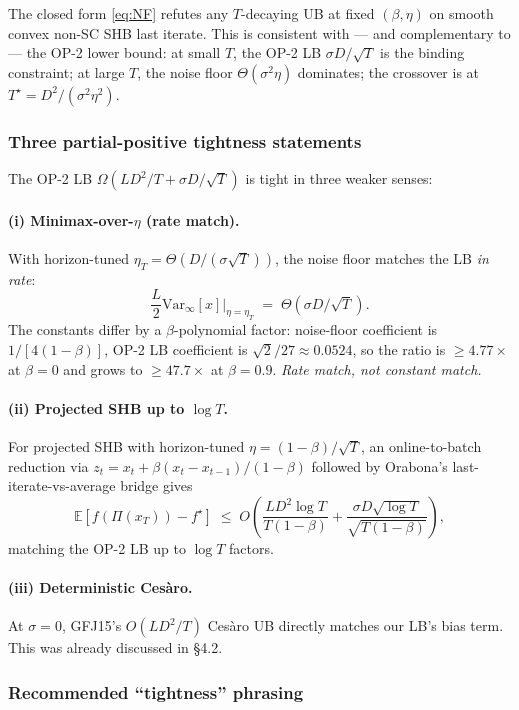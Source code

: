 \documentclass[11pt,a4paper]{article}
\theoremstyle{plain}
\theoremstyle{definition}
\theoremstyle{remark}
\newcommand{\E}{\mathbb{E}}
\begin{document}
The closed form \eqref{eq:NF} refutes any $T$-decaying UB at fixed $(\beta,\eta)$ on smooth convex non-SC SHB last iterate. This is consistent with --- and complementary to --- the OP-2 lower bound: at small $T$, the OP-2 LB $\sigma D/\sqrt T$ is the binding constraint; at large $T$, the noise floor $\Theta(\sigma^2\eta)$ dominates; the crossover is at $T^\star = D^2/(\sigma^2\eta^2)$.

\subsubsection*{Three partial-positive tightness statements}

The OP-2 LB $\Omega(LD^2/T + \sigma D/\sqrt T)$ is tight in three weaker senses:

\paragraph{(i) Minimax-over-$\eta$ (rate match).}
With horizon-tuned $\eta_T = \Theta(D/(\sigma\sqrt T))$, the noise floor matches the LB \emph{in rate}:
\[
  \frac{L}{2}\mathrm{Var}_\infty[x]\big|_{\eta=\eta_T} \;=\; \Theta(\sigma D / \sqrt T).
\]
The constants differ by a $\beta$-polynomial factor: noise-floor coefficient is $1/[4(1-\beta)]$, OP-2 LB coefficient is $\sqrt 2/27 \approx 0.0524$, so the ratio is $\geq 4.77\times$ at $\beta=0$ and grows to $\geq 47.7\times$ at $\beta=0.9$. \emph{Rate match, not constant match.}

\paragraph{(ii) Projected SHB up to $\log T$.}
For projected SHB with horizon-tuned $\eta = (1-\beta)/\sqrt T$, an online-to-batch reduction via $z_t = x_t + \beta(x_t - x_{t-1})/(1-\beta)$ followed by Orabona's last-iterate-vs-average bridge gives
\[
  \E[f(\Pi(x_T)) - f^\star] \;\leq\; O\!\left(\frac{LD^2 \log T}{T(1-\beta)} + \frac{\sigma D \sqrt{\log T}}{\sqrt{T(1-\beta)}}\right),
\]
matching the OP-2 LB up to $\log T$ factors.

\paragraph{(iii) Deterministic Ces\`aro.}
At $\sigma = 0$, GFJ15's $O(LD^2/T)$ Ces\`aro UB directly matches our LB's bias term. This was already discussed in \S4.2.

\subsubsection*{Recommended ``tightness'' phrasing}
\end{document}
